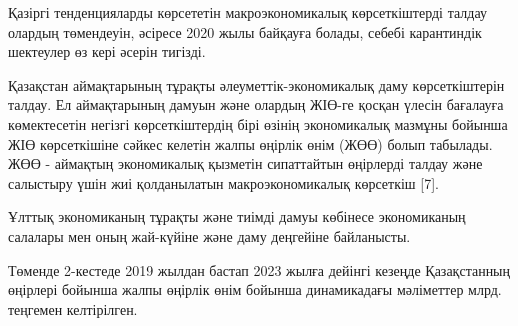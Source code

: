 \begin{multicols}{2}
Қазіргі тенденцияларды көрсететін макроэкономикалық көрсеткіштерді
талдау олардың төмендеуін, әсіресе 2020 жылы байқауға болады, себебі
карантиндік шектеулер өз кері әсерін тигізді.

Қазақстан аймақтарының тұрақты әлеуметтік-экономикалық даму
көрсеткіштерін талдау. Ел аймақтарының дамуын және олардың ЖІӨ-ге қосқан
үлесін бағалауға көмектесетін негізгі көрсеткіштердің бірі өзінің
экономикалық мазмұны бойынша ЖІӨ көрсеткішіне сәйкес келетін жалпы
өңірлік өнім (ЖӨӨ) болып табылады. ЖӨӨ - аймақтың экономикалық қызметін
сипаттайтын өңірлерді талдау және салыстыру үшін жиі қолданылатын
макроэкономикалық көрсеткіш {[}7{]}.

Ұлттық экономиканың тұрақты және тиімді дамуы көбінесе экономиканың
салалары мен оның жай-күйіне және даму деңгейіне байланысты.

Төменде 2-кестеде 2019 жылдан бастап 2023 жылға дейінгі кезеңде
Қазақстанның өңірлері бойынша жалпы өңірлік өнім бойынша динамикадағы
мәліметтер млрд. теңгемен келтірілген.
\end{multicols}

